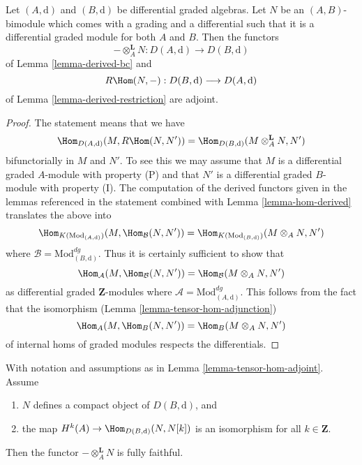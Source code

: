 \begin{lemma}
\label{lemma-tensor-hom-adjoint}
Let $(A, \text{d})$ and $(B, \text{d})$ be differential graded algebras.
Let $N$ be an $(A, B)$-bimodule which comes with a grading and a differential
such that it is a differential graded module for both $A$ and $B$.
Then the functors
$$
- \otimes_A^\mathbf{L} N : D(A, \text{d}) \longrightarrow D(B, \text{d})
$$
of Lemma \ref{lemma-derived-bc} and
$$
R\Hom(N, -) : D(B, \text{d}) \longrightarrow D(A, \text{d})
$$
of Lemma \ref{lemma-derived-restriction} are adjoint.
\end{lemma}

\begin{proof}
The statement means that we have
$$
\Hom_{D(A, \text{d})}(M, R\Hom(N, N')) =
\Hom_{D(B, \text{d})}(M \otimes^\mathbf{L}_A N, N')
$$
bifunctorially in $M$ and $N'$. To see this we may assume that $M$
is a differential graded $A$-module with property (P) and that $N'$
is a differential graded $B$-module with property (I). The computation
of the derived functors given in the lemmas referenced in the statement
combined with Lemma \ref{lemma-hom-derived} translates the above into
$$
\Hom_{K(\text{Mod}_{(A, \text{d})})}(M, \Hom_\mathcal{B}(N, N')) =
\Hom_{K(\text{Mod}_{(B, \text{d})})}(M \otimes_A N, N')
$$
where $\mathcal{B} = \text{Mod}^{dg}_{(B, \text{d})}$. Thus it is certainly
sufficient to show that
$$
\Hom_\mathcal{A}(M, \Hom_\mathcal{B}(N, N')) =
\Hom_\mathcal{B}(M \otimes_A N, N')
$$
as differential graded $\mathbf{Z}$-modules where
$\mathcal{A} = \text{Mod}^{dg}_{(A, \text{d})}$.
This follows from the fact that the isomorphism
(Lemma \ref{lemma-tensor-hom-adjunction})
$$
\Hom_A(M, \Hom_B(N, N')) = \Hom_B(M \otimes_A N, N')
$$
of internal homs of graded modules respects the differentials.
\end{proof}

\begin{lemma}
\label{lemma-tensor-with-compact-fully-faithful}
With notation and assumptions as in Lemma \ref{lemma-tensor-hom-adjoint}.
Assume
\begin{enumerate}
\item $N$ defines a compact object of $D(B, \text{d})$, and
\item the map $H^k(A) \to \Hom_{D(B, \text{d})}(N, N[k])$ is an
isomorphism for all $k \in \mathbf{Z}$.
\end{enumerate}
Then the functor $-\otimes_A^\mathbf{L} N$ is fully faithful.
\end{lemma}

